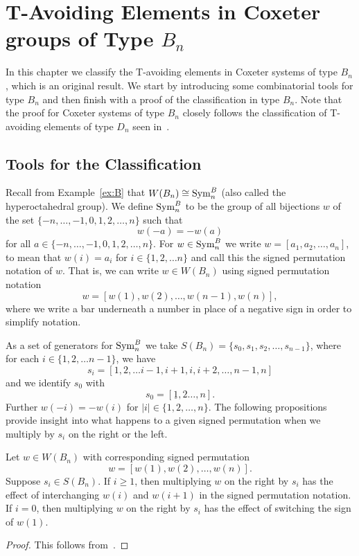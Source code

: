 \chapter{T-Avoiding Elements in Coxeter groups of Type $B_n$}\label{chap:BnandCn}

In this chapter we classify the T-avoiding elements in Coxeter systems of type $B_n$, which is an original result. We start by introducing some combinatorial tools for type $B_n$ and then finish with a proof of the classification in type $B_n$. Note that the proof for Coxeter systems of type $B_n$ closely follows the classification of T-avoiding elements of type $D_n$ seen in~\cite{Gern2013a}. 

\section{Tools for the Classification}\label{sec:Btools}

Recall from Example~\ref{ex:B} that $W(B_n) \cong \mathrm{Sym}_n^B$ (also called the hyperoctahedral group). We define $\mathrm{Sym}_n^B$ to be the group of all bijections $w$ of the set $\{-n, \ldots, -1, 0, 1, 2, \ldots, n\}$ such that 
\[w(-a)=-w(a)\] for all $a \in \{-n, \ldots, -1, 0, 1, 2, \ldots, n\}$. For $w \in \mathrm{Sym}_n^B$ we write $w=[a_1, a_2, \ldots, a_n]$, to mean that $w(i)=a_i$ for $i \in \{1,2, \ldots n\}$ and call this the signed permutation notation of $w$. That is, we can write $w \in W(B_n)$ using signed permutation notation 
\[ w=[w(1),w(2), \ldots, w(n-1), w(n)], \]
where we write a bar underneath a number in place of a negative sign in order to simplify notation. 

As a set of generators for $\mathrm{Sym}_n^B$ we take $S(B_n)=\{s_0,s_1,s_2, \ldots, s_{n-1}\}$, where for each $i \in \{1,2,\ldots n-1\}$, we have
\[s_i=[1,2, \ldots i-1, i+1,i,i+2, \ldots, n-1,n] \] and we identify $s_0$ with
\[s_0=[\underline{1}, 2 \ldots, n].\] Further $w(-i)=-w(i)$ for $|i| \in \{1,2, \ldots, n\}$. The following propositions provide insight into what happens to a given signed permutation when we multiply by $s_i$ on the right or the left.

\begin{proposition}
	Let $w \in W(B_n)$ with corresponding signed permutation 
	\[w=[w(1),w(2), \ldots ,w(n)].\] Suppose $s_i \in S(B_n)$. If $i \geq 1$, then multiplying $w$ on the right by $s_i$ has the effect of interchanging $w(i)$ and $w(i+1)$ in  the signed permutation notation. If $i=0$, then multiplying $w$ on the right by $s_i$ has the effect of switching the sign of $w(1)$. 	
	\begin{proof}
	This follows from~\cite[Section 8.1 and A3.1]{Bjorner2005}.	
	\end{proof}
\end{proposition}

